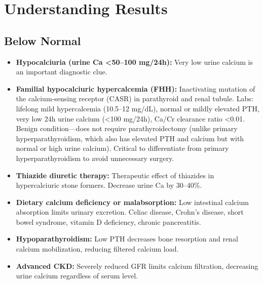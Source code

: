 \section*{Understanding Results}

\subsection*{Below Normal}
\begin{itemize}
  \item \textbf{Hypocalciuria (urine Ca <50--100 mg/24h):} Very low urine calcium is an important diagnostic clue.
  \item \textbf{Familial hypocalciuric hypercalcemia (FHH):} Inactivating mutation of the calcium-sensing receptor (CASR) in parathyroid and renal tubule. Labs: lifelong mild hypercalcemia (10.5--12 mg/dL), normal or mildly elevated PTH, very low 24h urine calcium (<100 mg/24h), Ca/Cr clearance ratio <0.01. Benign condition---does not require parathyroidectomy (unlike primary hyperparathyroidism, which also has elevated PTH and calcium but with normal or high urine calcium). Critical to differentiate from primary hyperparathyroidism to avoid unnecessary surgery.
  \item \textbf{Thiazide diuretic therapy:} Therapeutic effect of thiazides in hypercalciuric stone formers. Decrease urine Ca by 30--40\%.
  \item \textbf{Dietary calcium deficiency or malabsorption:} Low intestinal calcium absorption limits urinary excretion. Celiac disease, Crohn's disease, short bowel syndrome, vitamin D deficiency, chronic pancreatitis.
  \item \textbf{Hypoparathyroidism:} Low PTH decreases bone resorption and renal calcium mobilization, reducing filtered calcium load.
  \item \textbf{Advanced CKD:} Severely reduced GFR limits calcium filtration, decreasing urine calcium regardless of serum level.
\end{itemize}

